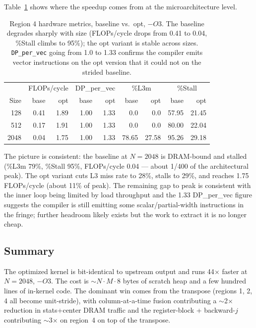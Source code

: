 \documentclass[11pt]{article}
\begin{document}
Table~\ref{tab:hwmetrics} shows where the speedup comes from at the microarchitecture level.

\begin{table}[htp]
\centering
\small
\begin{tabular}{r | r r | r r | r r | r r}
\toprule
       & \multicolumn{2}{c|}{FLOPs/cycle} & \multicolumn{2}{c|}{DP\_per\_vec} & \multicolumn{2}{c|}{\%L3m} & \multicolumn{2}{c}{\%Stall} \\
Size & base & opt & base & opt & base & opt & base & opt \\
\midrule
128  & 0.41 & 1.89 & 1.00 & 1.33 &  0.0 &  0.0 & 57.95 & 21.45 \\
512  & 0.17 & 1.91 & 1.00 & 1.33 &  0.0 &  0.0 & 80.00 & 22.04 \\
2048 & 0.04 & 1.75 & 1.00 & 1.33 & 78.65 & 27.58 & 95.26 & 29.18 \\
\bottomrule
\end{tabular}
\caption{Region 4 hardware metrics, baseline vs.\ opt, $-O3$. The baseline degrades sharply with size (FLOPs/cycle drops from 0.41 to 0.04, \%Stall climbs to 95\%); the opt variant is stable across sizes. \texttt{DP\_per\_vec} going from 1.0 to 1.33 confirms the compiler emits vector instructions on the opt version that it could not on the strided baseline.}
\label{tab:hwmetrics}
\end{table}

The picture is consistent: the baseline at $N{=}2048$ is DRAM-bound and stalled (\%L3m 79\%, \%Stall 95\%, FLOPs/cycle 0.04 --- about 1/400 of the architectural peak). The opt variant cuts L3 miss rate to 28\%, stalls to 29\%, and reaches 1.75 FLOPs/cycle (about 11\% of peak). The remaining gap to peak is consistent with the inner loop being limited by load throughput and the 1.33 DP\_per\_vec figure suggests the compiler is still emitting some scalar/partial-width instructions in the fringe; further headroom likely exists but the work to extract it is no longer cheap.

\subsection{Summary}

The optimized kernel is bit-identical to upstream output and runs 44$\times$ faster at $N{=}2048$, $-O3$. The cost is $\sim$$N{\cdot}M{\cdot}8$ bytes of scratch heap and a few hundred lines of in-kernel code. The dominant win comes from the transpose (regions 1, 2, 4 all become unit-stride), with column-at-a-time fusion contributing a $\sim$2$\times$ reduction in stats+center DRAM traffic and the register-block + backward-$j$ contributing $\sim$3$\times$ on region~4 on top of the transpose.
\end{document}
